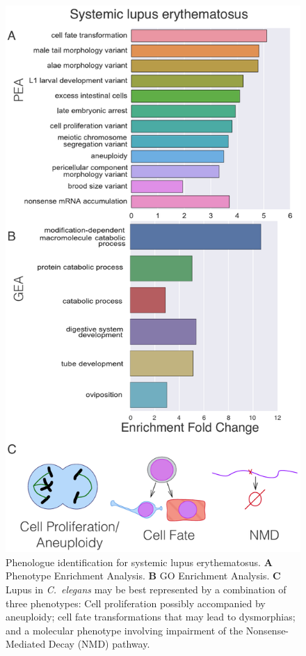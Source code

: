 \documentclass[10pt,letterpaper,twocolumn]{article}
\newcommand{\cel}{\emph{C.~elegans}}
\begin{document}
\begin{figure}[htbp]
  \renewcommand{\familydefault}{\sfdefault}\normalfont{}
  \centering
  \includegraphics[width=\linewidth]{systemic-lupus.pdf}
  \caption{Phenologue identification for systemic lupus erythematosus.
           \textbf{A} Phenotype Enrichment Analysis. \textbf{B} GO Enrichment
           Analysis. \textbf{C} Lupus in \cel{} may be best represented by
           a combination of three phenotypes: Cell proliferation possibly
           accompanied by aneuploidy; cell fate transformations that may lead
           to dysmorphias; and a molecular phenotype involving impairment of
           the Nonsense-Mediated Decay (NMD) pathway.}
\label{fig:lupus}
\end{figure}
\end{document}
